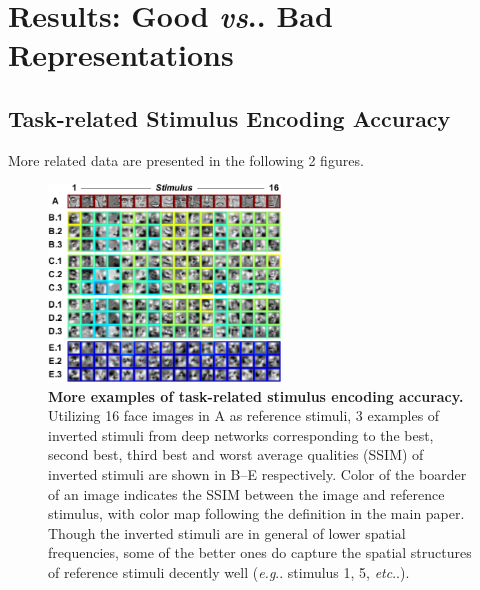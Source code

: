 \documentclass{article} %
\makeatletter
\DeclareRobustCommand\onedot{\futurelet\@let@token\@onedot}
\def\@onedot{\ifx\@let@token.\else.\null\fi\xspace}
\def\eg{\emph{e.g}\onedot} \def\Eg{\emph{E.g}\onedot}
\def\ie{\emph{i.e}\onedot} \def\Ie{\emph{I.e}\onedot}
\def\etc{\emph{etc}\onedot} \def\vs{\emph{vs}\onedot}
\makeatother
\begin{document}
\clearpage

\section{Results: Good \vs Bad Representations}

\subsection{Task-related Stimulus Encoding Accuracy}
More related data are presented in the following 2 figures.

\begin{figure}[H]
\centering \includegraphics[width=0.55\textwidth]{Figs_supp/pic4.pdf} 
\caption{{\bf More examples of task-related stimulus encoding accuracy.}
Utilizing 16 face images in A as reference stimuli, 3 examples of inverted stimuli from deep networks corresponding to the best, second best, third best and worst average qualities (SSIM) of inverted stimuli are shown in B--E respectively.
Color of the boarder of an image indicates the SSIM between the image and reference stimulus, with color map following the definition in the main paper.
Though the inverted stimuli are in general of lower spatial frequencies, some of the better ones do capture the spatial structures of reference stimuli decently well (\eg stimulus 1, 5, \etc).
} %
\label{refstim1}
\end{figure}
\end{document}
